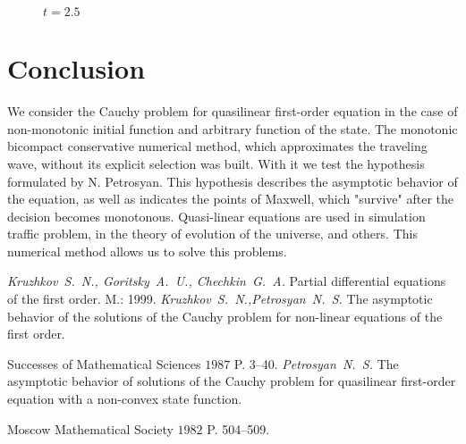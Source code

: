 \documentclass[journal]{IEEEtran}
\begin{document}
\begin{figure}[h!]
	\caption{$t = 2.5$}
\end{figure}

\pagebreak
\section{Conclusion}

We consider the Cauchy problem for quasilinear first-order equation in the case of non-monotonic initial function and arbitrary function of the state. The monotonic bicompact conservative numerical method, which approximates the traveling wave, without its explicit selection was built. With it we test the hypothesis formulated by N. Petrosyan. This hypothesis describes the asymptotic behavior of the equation, as well as indicates the points of Maxwell, which "survive" after the decision becomes monotonous. Quasi-linear equations are used in simulation traffic problem, in the theory of evolution of the universe, and others. This numerical method allows us to solve this problems.

\begin{thebibliography}{9}
	{\it Kruzhkov~S.~N., Goritsky~A.~U., Chechkin~G.~A.}
	Partial differential equations of the first order.
	M.: 1999.
	{\it Kruzhkov~S.~N.,Petrosyan~N.~S.}
	The asymptotic behavior of the solutions of the Cauchy problem for non-linear equations of the first order.
	
	Successes of Mathematical Sciences $1987$ P. 3--40.
	{\it Petrosyan~N.~S.}
	The asymptotic behavior of solutions of the Cauchy problem for quasilinear first-order equation with a non-convex state function.
	
	Moscow Mathematical Society $1982$ P. 504--509.
\end{thebibliography}
\end{document}
